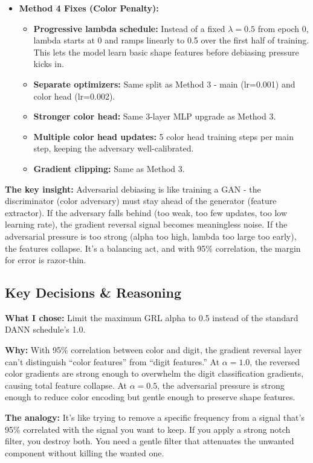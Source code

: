 \documentclass[9pt,a4paper,twocolumn,twoside]{tau-class/tau}
\begin{document}
\begin{itemize}
            \item \textbf{Method 4 Fixes (Color Penalty):}
            \begin{itemize}
                \item \textbf{Progressive lambda schedule:} Instead of a fixed $\lambda = 0.5$ from epoch 0, lambda starts at 0 and ramps linearly to 0.5 over the first half of training. This lets the model learn basic shape features before debiasing pressure kicks in.
                \item \textbf{Separate optimizers:} Same split as Method 3 - main (lr=0.001) and color head (lr=0.002).
                \item \textbf{Stronger color head:} Same 3-layer MLP upgrade as Method 3.
                \item \textbf{Multiple color head updates:} 5 color head training steps per main step, keeping the adversary well-calibrated.
                \item \textbf{Gradient clipping:} Same as Method 3.
            \end{itemize}
        \end{itemize}

        \begin{note}
            \textbf{The key insight:} Adversarial debiasing is like training a GAN - the discriminator (color adversary) must stay ahead of the generator (feature extractor). If the adversary falls behind (too weak, too few updates, too low learning rate), the gradient reversal signal becomes meaningless noise. If the adversarial pressure is too strong (alpha too high, lambda too large too early), the features collapse. It's a balancing act, and with 95\% correlation, the margin for error is razor-thin.
        \end{note}

    \subsection{Key Decisions \& Reasoning}

        \begin{tauenv}[frametitle={Decision: Cap GRL Strength at $\alpha_{\max} = 0.5$}]
            \textbf{What I chose:} Limit the maximum GRL alpha to 0.5 instead of the standard DANN schedule's 1.0.

            \textbf{Why:} With 95\% correlation between color and digit, the gradient reversal layer can't distinguish ``color features'' from ``digit features.'' At $\alpha = 1.0$, the reversed color gradients are strong enough to overwhelm the digit classification gradients, causing total feature collapse. At $\alpha = 0.5$, the adversarial pressure is strong enough to reduce color encoding but gentle enough to preserve shape features.

            \textbf{The analogy:} It's like trying to remove a specific frequency from a signal that's 95\% correlated with the signal you want to keep. If you apply a strong notch filter, you destroy both. You need a gentle filter that attenuates the unwanted component without killing the wanted one.
        \end{tauenv}
\end{document}
